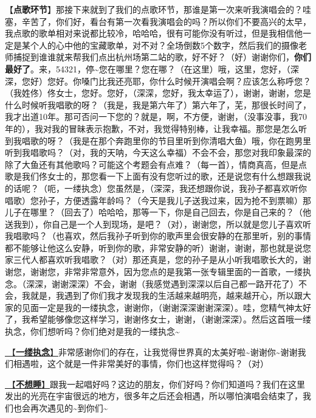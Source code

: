 \documentclass[]{ctexbook}
\begin{document}
【\textbf{点歌环节}】那接下来就到了我们的点歌环节，那谁是第一次来听我演唱会的？哇塞，辛苦了，你们好，看台有第一次看我演唱会的吗？所以你们不要高兴的太早，我点歌的歌单相对来说都比较冷，哈哈哈，很有可能你没有听过，但是我相信他一定是某个人的心中他的宝藏歌单，对不对？全场倒数5个数字，然后我们的摄像老师捕捉到谁谁就来帮我们点出杭州场第二站的歌，好不好？（好）谢谢你们，\textbf{你们最好了}。来，54321，停\textasciitilde 您在哪里？您在哪？（在这里）哦，这里，您好，（深深，您好）您好。你嗓门比我还亮耶，你什么时候开演唱会啊？应该怎么称呼您？（我姓佟）佟女士，您好。您好，（深深，您好，我太幸运了），谢谢，谢谢，您是什么时候听我唱歌的呀？（我是，我是第六年了）第六年了，芜，那很长时间了，我才出道10年。那可否问一下您的？就是，啊，不方便，谢谢，（没事没事，我70年的），我对我的冒昧表示抱歉，不对，我觉得特别棒，让我幸福。那您是怎么听到我唱歌的呀？（我是在那个奔跑里你的节目里听到你清唱大鱼）哦，你在跑男里听到我唱歌吗？（对，我的天呐，今天这么幸福）不会不会，那您对我印象最深的除了大鱼还有其他歌吗？可能这个考题会有点难？（每一首），情商真高，但是点歌是我们佟女士的，那您看一下上面有没有您听过的歌，还是说您有什么想跟我说的话呢？（呃，一缕执念）您虽然是，（深深，我还想跟你说，我孙子都喜欢听你唱歌）您孙子，方便透露年龄吗？（今天是我儿子送我过来，因为抢不到票嘛）那儿子在哪里？（回去了）哈哈哈，那等一下，你是自己回去，你是自己来的？（他送我到），你自己是一个人到现场，是吧？（对），谢谢您，所以就是您儿子喜欢听我唱歌吗？（也喜欢，然后我孙子听到你的歌声里会很安静的在那里听，别的事情都不能够让他这么安静，听到你的歌，非常安静的听）谢谢，谢谢，那也就是说您家三代人都喜欢听我唱歌？（对）那还真是，您的孙子是从小听我唱歌长大的，谢谢您，谢谢您，非常非常意外，因为您点的是我第一张专辑里面的一首歌，一缕执念。（深深，谢谢深深）不会，谢谢（我感觉遇到深深以后自己都一路开花了）不会，我就是，我遇到了你们我才发现我的生活越来越明亮，越来越开心，所以跟大家的见面一定是我的一缕执念，谢谢你，（谢谢深深谢谢深深）。哇，您精气神太好了，我希望能够像您这样学习，谢谢佟女士，谢谢，（谢谢深深）。然后这首哦一缕执念，你们想听吗？你们绝对是我的一缕执念\textasciitilde{}

\hyperref[a-wisp-of-obsession]{🎵【\textbf{一缕执念}】}非常感谢你们的存在，让我觉得世界真的太美好啦\textasciitilde 谢谢你\textasciitilde 谢谢我们相遇啦，这个就是一件非常美好的事情，你们也这样觉得吗？（对）

\hyperref[keep-playing]{🎵【\textbf{不想睡}】}跟我一起唱好吗？这边的朋友，你们好吗？你们知道吗？我们在这里发出的光亮在宇宙很远的地方，很多年之后还会相遇，所以哪怕演唱会结束了，我们也会再次遇见的\textasciitilde 到你们\textasciitilde{}
\end{document}
